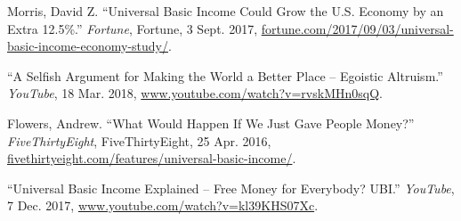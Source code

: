 \documentclass[10pt,a4paper]{article}
\begin{document}
\begin{thebibliography}{9}
		 Morris, David Z. “Universal Basic Income Could Grow the U.S. Economy by an Extra 12.5\%.” \textit{Fortune}, Fortune, 3 Sept. 2017, \url{fortune.com/2017/09/03/universal-basic-income-economy-study/}.
		
		“A Selfish Argument for Making the World a Better Place – Egoistic Altruism.” \textit{YouTube}, 18 Mar. 2018, \url{www.youtube.com/watch?v=rvskMHn0sqQ}.
		
		Flowers, Andrew. “What Would Happen If We Just Gave People Money?” \textit{FiveThirtyEight}, FiveThirtyEight, 25 Apr. 2016, \url{fivethirtyeight.com/features/universal-basic-income/}.
		
		“Universal Basic Income Explained – Free Money for Everybody? UBI.” \textit{YouTube}, 7 Dec. 2017, \url{www.youtube.com/watch?v=kl39KHS07Xc}.
		
		‌
	\end{thebibliography}
\end{document}

